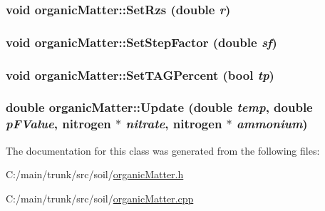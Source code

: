 \label{classorganic_matter_a4d0b7d6e7cf64fdfccff6d0f4004d6d1}
\hypertarget{classorganic_matter_aa36b3c3476900a2160aaefdaa9be75ce}{
\subsubsection[{SetRzs}]{\setlength{\rightskip}{0pt plus 5cm}void organicMatter::SetRzs (double {\em r})}}
\label{classorganic_matter_aa36b3c3476900a2160aaefdaa9be75ce}
\hypertarget{classorganic_matter_ade566ec0fc948e8215e30f12c4905259}{
\subsubsection[{SetStepFactor}]{\setlength{\rightskip}{0pt plus 5cm}void organicMatter::SetStepFactor (double {\em sf})}}
\label{classorganic_matter_ade566ec0fc948e8215e30f12c4905259}
\hypertarget{classorganic_matter_a2173970ef85445737548b25b64a40cdd}{
\subsubsection[{SetTAGPercent}]{\setlength{\rightskip}{0pt plus 5cm}void organicMatter::SetTAGPercent (bool {\em tp})}}
\label{classorganic_matter_a2173970ef85445737548b25b64a40cdd}
\hypertarget{classorganic_matter_afe20379314e0eb234bd6b6c8684c41d4}{
\subsubsection[{Update}]{\setlength{\rightskip}{0pt plus 5cm}double organicMatter::Update (double {\em temp}, \/  double {\em pFValue}, \/  {\bf nitrogen} $\ast$ {\em nitrate}, \/  {\bf nitrogen} $\ast$ {\em ammonium})}}
\label{classorganic_matter_afe20379314e0eb234bd6b6c8684c41d4}


The documentation for this class was generated from the following files:\begin{DoxyCompactItemize}
\item 
C:/main/trunk/src/soil/\hyperlink{organic_matter_8h}{organicMatter.h}\item 
C:/main/trunk/src/soil/\hyperlink{organic_matter_8cpp}{organicMatter.cpp}\end{DoxyCompactItemize}
